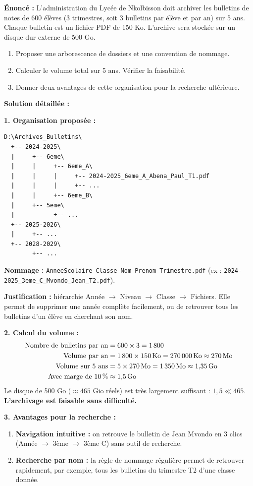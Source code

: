 \documentclass[11pt]{article}
\begin{document}
\begin{exoresolu}
\textbf{Énoncé :} L'administration du Lycée de Nkolbisson doit archiver les bulletins de notes de 600 élèves (3 trimestres, soit 3 bulletins par élève et par an) sur 5 ans. Chaque bulletin est un fichier PDF de 150 Ko. L'archive sera stockée sur un disque dur externe de 500 Go.
\begin{enumerate}
    \item Proposer une arborescence de dossiers et une convention de nommage.
    \item Calculer le volume total sur 5 ans. Vérifier la faisabilité.
    \item Donner deux avantages de cette organisation pour la recherche ultérieure.
\end{enumerate}

\tcblower

\textbf{Solution détaillée :}

\textbf{1. Organisation proposée :}
\begin{lstlisting}
D:\Archives_Bulletins\
  +-- 2024-2025\
  |     +-- 6eme\
  |     |     +-- 6eme_A\
  |     |     |     +-- 2024-2025_6eme_A_Abena_Paul_T1.pdf
  |     |     |     +-- ...
  |     |     +-- 6eme_B\
  |     +-- 5eme\
  |           +-- ...
  +-- 2025-2026\
  |     +-- ...
  +-- 2028-2029\
        +-- ...
\end{lstlisting}
\textbf{Nommage :} \texttt{AnneeScolaire\_Classe\_Nom\_Prenom\_Trimestre.pdf} (ex : \texttt{2024-2025\_3eme\_C\_Mvondo\_Jean\_T2.pdf}).

\textbf{Justification :} hiérarchie Année $\to$ Niveau $\to$ Classe $\to$ Fichiers. Elle permet de supprimer une année complète facilement, ou de retrouver tous les bulletins d'un élève en cherchant son nom.

\textbf{2. Calcul du volume :}
\begin{align*}
\text{Nombre de bulletins par an} &= 600 \times 3 = 1\,800 \\
\text{Volume par an} &= 1\,800 \times 150\,\text{Ko} = 270\,000\,\text{Ko} \approx 270\,\text{Mo} \\
\text{Volume sur 5 ans} &= 5 \times 270\,\text{Mo} = 1\,350\,\text{Mo} \approx 1{,}35\,\text{Go} \\
\text{Avec marge de 10\,\%} &\approx 1{,}5\,\text{Go}
\end{align*}
Le disque de 500 Go ($\approx 465$ Gio réels) est très largement suffisant : $1{,}5 \ll 465$. \textbf{L'archivage est faisable sans difficulté.}

\textbf{3. Avantages pour la recherche :}
\begin{enumerate}
    \item \textbf{Navigation intuitive :} on retrouve le bulletin de Jean Mvondo en 3 clics (Année $\to$ 3ème $\to$ 3ème C) sans outil de recherche.
    \item \textbf{Recherche par nom :} la règle de nommage régulière permet de retrouver rapidement, par exemple, tous les bulletins du trimestre T2 d'une classe donnée.
\end{enumerate}
\end{exoresolu}
\end{document}
